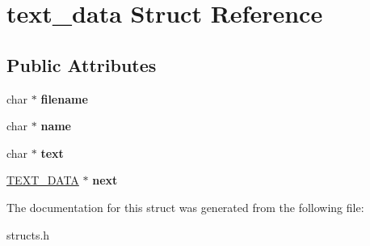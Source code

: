 \hypertarget{structtext__data}{\section{text\-\_\-data Struct Reference}
\label{structtext__data}
}
\subsection*{Public Attributes}
\begin{DoxyCompactItemize}
\item 
\hypertarget{structtext__data_ab5ba1f2ba85ead4797f8d96eaec6ecc6}{char $\ast$ {\bfseries filename}}\label{structtext__data_ab5ba1f2ba85ead4797f8d96eaec6ecc6}

\item 
\hypertarget{structtext__data_a3f5426e1540802213102e386ce97bbf0}{char $\ast$ {\bfseries name}}\label{structtext__data_a3f5426e1540802213102e386ce97bbf0}

\item 
\hypertarget{structtext__data_a2fac5a089d89f9333afef2c7ec68d1c4}{char $\ast$ {\bfseries text}}\label{structtext__data_a2fac5a089d89f9333afef2c7ec68d1c4}

\item 
\hypertarget{structtext__data_a8f86e505ae21c67e5fb2212a1f7fc0f4}{\hyperlink{structtext__data}{T\-E\-X\-T\-\_\-\-D\-A\-T\-A} $\ast$ {\bfseries next}}\label{structtext__data_a8f86e505ae21c67e5fb2212a1f7fc0f4}

\end{DoxyCompactItemize}


The documentation for this struct was generated from the following file\-:\begin{DoxyCompactItemize}
\item 
structs.\-h\end{DoxyCompactItemize}
